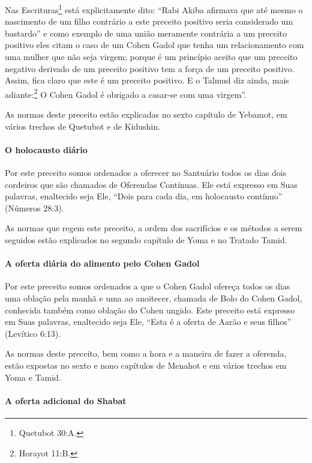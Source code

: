 Nas Escrituras\footnote{Quetubot 30:A.} está explicitamente dito: ``Rabi
Akiba afirmava que até mesmo o nascimento de um filho contrário a este
preceito positivo seria considerado um bastardo'' e como exemplo de uma
união meramente contrária a um preceito positivo eles citam o caso de um
Cohen Gadol que tenha um relacionamento com uma mulher que não seja
virgem; porque é um princípio aceito que um preceito negativo derivado
de um preceito positivo tem a força de um preceito positivo. Assim, fica
claro que este é um preceito positivo. E o Talmud diz ainda, mais
adiante:\footnote{Horayot 11:B.} O Cohen Gadol é obrigado a casar-se com
uma virgem''.

As normas deste preceito estão explicadas no sexto capítulo de Yebamot,
em vários trechos de Quetubot e de Kidushin.

\paragraph{O holocausto diário}

Por este preceito somos ordenados a oferecer no Santuário todos os dias
dois cordeiros que são chamados de Oferendas Contínuas. Ele está
expresso em Suas palavras, enaltecido seja Ele, ``Dois para cada dia,
em holocausto contínuo'' (Números 28:3).

As normas que regem este preceito, a ordem dos sacrifícios e os métodos
a serem seguidos estão explicados no segundo capítulo de Yoma e no
Tratado Tamid.

\paragraph{A oferta diária do alimento pelo Cohen Gadol}

Por este preceito somos ordenados a que o Cohen Gadol ofereça todos
os dias uma oblação pela manhã e uma ao anoitecer, chamada de Bolo
do Cohen Gadol, conhecida também como oblação do Cohen ungido.
Este preceito está expresso em Suas palavras, enaltecido seja Ele,
``Esta é a oferta de Aarão e seus filhos'' (Levítico 6:13).

As normas deste preceito, bem como a hora e a maneira de fazer a
oferenda, estão expostas no sexto e nono capítulos de Menahot e em
vários trechos em Yoma e Tamid.

\paragraph{A oferta adicional do Shabat}

